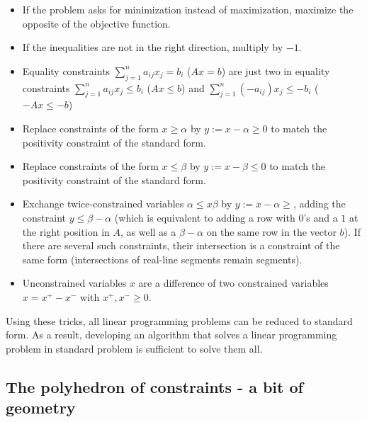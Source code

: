 \begin{itemize}
    \item If the problem asks for minimization instead of maximization, maximize the opposite of the objective function.
    
    \item If the inequalities are not in the right direction, multiply by $ -1 $. 

    \item Equality constraints $ \sum_{j=1}^n a_{ij}x_j = b_i $ ($ Ax = b $) are just two in equality constraints $ \sum_{j=1}^n a_{ij}x_j \leqslant b_i $ ($ Ax \leqslant b $) and $ \sum_{j=1}^n (-a_{ij})x_j \leqslant -b_i $ ($ -Ax \leqslant -b $)

    \item Replace constraints of the form $ x \geqslant \alpha $ by $ y := x - \alpha \geqslant 0$ to match the positivity constraint of the standard form.

    \item Replace constraints of the form $ x \leqslant \beta $ by $ y := x - \beta \leqslant 0$ to match the positivity constraint of the standard form.

    \item Exchange twice-constrained variables $ \alpha \leqslant x \beta $ by $ y := x - \alpha \geqslant $, adding the constraint $ y \leqslant \beta - \alpha $ (which is equivalent to adding a row with $ 0 $'s and a $ 1 $ at the right position in $ A $, as well as a $ \beta - \alpha $ on the same row in the vector $ b $). If there are several such constraints, their intersection is a constraint of the same form (intersections of real-line segments remain segments).

    \item Unconstrained variables $ x $ are a difference of two constrained variables $ x = x^+ - x^- $ with $ x^+, x^- \geqslant 0 $.
\end{itemize}

Using these tricks, all linear programming problems can be reduced to standard form. As a result, developing an algorithm that solves a linear programming problem in standard problem is sufficient to solve them all.

\subsection{The polyhedron of constraints - a bit of geometry}

